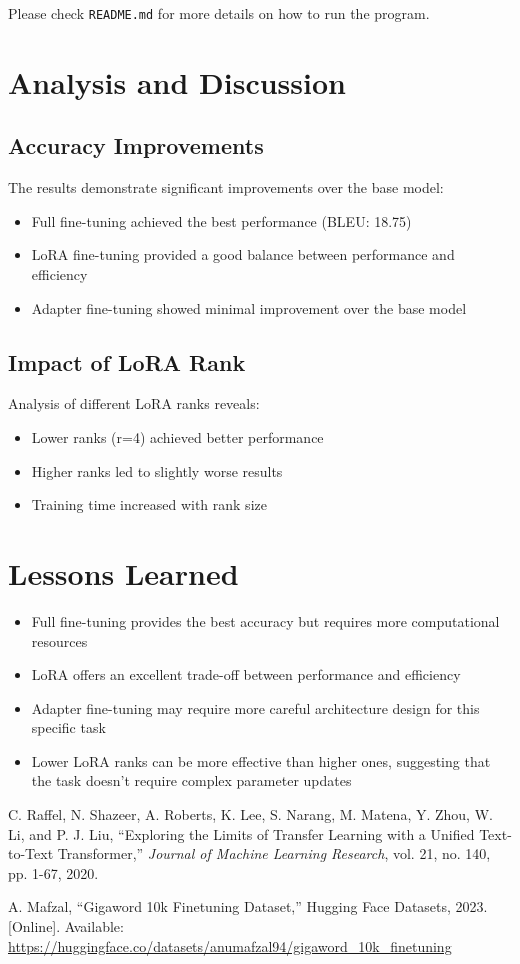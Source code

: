 \documentclass[conference]{IEEEtran}
\begin{document}
Please check \texttt{README.md} for more details on how to run the program.

\section{Analysis and Discussion}

\subsection{Accuracy Improvements}
The results demonstrate significant improvements over the base model:
\begin{itemize}
    \item Full fine-tuning achieved the best performance (BLEU: 18.75)
    \item LoRA fine-tuning provided a good balance between performance and efficiency
    \item Adapter fine-tuning showed minimal improvement over the base model
\end{itemize}

\subsection{Impact of LoRA Rank}
Analysis of different LoRA ranks reveals:
\begin{itemize}
    \item Lower ranks (r=4) achieved better performance
    \item Higher ranks led to slightly worse results
    \item Training time increased with rank size
\end{itemize}

\section{Lessons Learned}
\begin{itemize}
    \item Full fine-tuning provides the best accuracy but requires more computational resources
    \item LoRA offers an excellent trade-off between performance and efficiency
    \item Adapter fine-tuning may require more careful architecture design for this specific task
    \item Lower LoRA ranks can be more effective than higher ones, suggesting that the task doesn't require complex parameter updates
\end{itemize}

\begin{thebibliography}{9}
C. Raffel, N. Shazeer, A. Roberts, K. Lee, S. Narang, M. Matena, Y. Zhou, W. Li, and P. J. Liu,
``Exploring the Limits of Transfer Learning with a Unified Text-to-Text Transformer,''
\textit{Journal of Machine Learning Research}, vol. 21, no. 140, pp. 1-67, 2020.

A. Mafzal,
``Gigaword 10k Finetuning Dataset,''
Hugging Face Datasets, 2023.
[Online]. Available: \url{https://huggingface.co/datasets/anumafzal94/gigaword_10k_finetuning}
\end{thebibliography}
\end{document}
